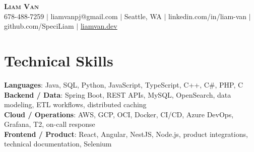 \documentclass[letterpaper,11pt]{article}
\begin{document}

%
\begin{center}
    \textbf{\Huge \scshape Liam Van} \\ \vspace{1pt}
    \small 678-488-7259 $|$ \small {liamvanpj@gmail.com} $|$ Seattle, WA
 {{$|$ linkedin.com/in/liam-van} {$|$ github.com/SpeciLiam} {$|$ \href{https://liamvan.dev}{liamvan.dev}}}

\end{center}

\section{Technical Skills}
 \begin{itemize}[leftmargin=0.15in, label={}]
    \small{\item{
     \textbf{Languages}{: Java, SQL, Python, JavaScript, TypeScript, C++, C\#, PHP, C} \\
     \textbf{Backend / Data}{: Spring Boot, REST APIs, MySQL, OpenSearch, data modeling, ETL workflows, distributed caching} \\
     \textbf{Cloud / Operations}{: AWS, GCP, OCI, Docker, CI/CD, Azure DevOps, Grafana, T2, on-call response} \\
     \textbf{Frontend / Product}{: React, Angular, NestJS, Node.js, product integrations, technical documentation, Selenium} \\
    }}
 \end{itemize}
%

\end{document}
